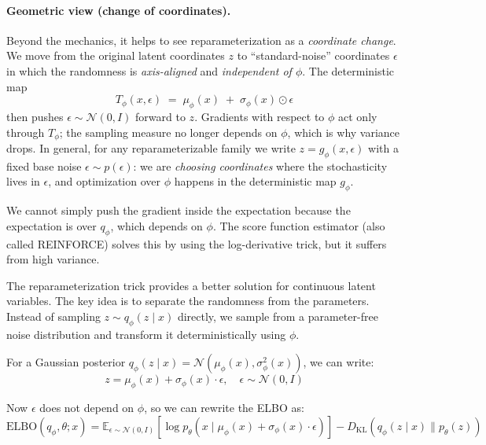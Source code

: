 \paragraph{Geometric view (change of coordinates).}
Beyond the mechanics, it helps to see reparameterization as a \emph{coordinate change}. We move from the original latent coordinates $z$ to ``standard-noise'' coordinates $\epsilon$ in which the randomness is \emph{axis-aligned} and \emph{independent of $\phi$}. The deterministic map
%
\[
T_\phi(x, \epsilon) \;=\; \mu_\phi(x) \;+\; \sigma_\phi(x) \odot \epsilon
\]
%
then pushes $\epsilon \sim \mathcal{N}(0, I)$ forward to $z$. Gradients with respect to $\phi$ act only through $T_\phi$; the sampling measure no longer depends on $\phi$, which is why variance drops. In general, for any reparameterizable family we write $z = g_\phi(x, \epsilon)$ with a fixed base noise $\epsilon \sim p(\epsilon)$: we are \emph{choosing coordinates} where the stochasticity lives in $\epsilon$, and optimization over $\phi$ happens in the deterministic map $g_\phi$.

\vspace{0.3cm}


\vspace{0.3cm}

We cannot simply push the gradient inside the expectation because the expectation is over $q_\phi$, which depends on $\phi$. The score function estimator (also called REINFORCE) solves this by using the log-derivative trick, but it suffers from high variance.

\vspace{0.3cm}

The reparameterization trick provides a better solution for continuous latent variables. The key idea is to separate the randomness from the parameters. Instead of sampling $z \sim q_\phi(z \mid x)$ directly, we sample from a parameter-free noise distribution and transform it deterministically using $\phi$.

\vspace{0.3cm}

For a Gaussian posterior $q_\phi(z \mid x) = \mathcal{N}(\mu_\phi(x), \sigma^2_\phi(x))$, we can write:
%
\begin{equation}
z = \mu_\phi(x) + \sigma_\phi(x) \cdot \epsilon, \quad \epsilon \sim \mathcal{N}(0, I)
\end{equation}

\vspace{0.3cm}

Now $\epsilon$ does not depend on $\phi$, so we can rewrite the ELBO as:
%
\begin{equation}
\text{ELBO}(q_\phi, \theta; x) = \mathbb{E}_{\epsilon \sim \mathcal{N}(0,I)} \left[ \log p_\theta(x \mid \mu_\phi(x) + \sigma_\phi(x) \cdot \epsilon) \right]
- D_{\text{KL}}(q_\phi(z \mid x) \| p_\theta(z))
\end{equation}

